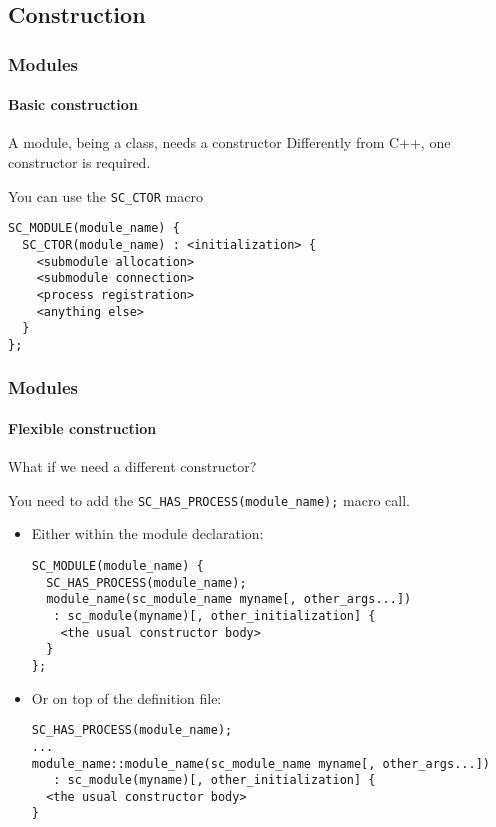 \subsection{Construction}

\begin{frame}[fragile]
\frametitle{Modules}
\framesubtitle{Basic construction}

\begin{block}{A module, being a class, needs a constructor}
Differently from C++, one constructor is required.
\end{block}
\pause
\begin{block}{You can use the \texttt{SC\_CTOR} macro}
\vspace{-1em}
\begin{verbatim}
SC_MODULE(module_name) {
  SC_CTOR(module_name) : <initialization> {
    <submodule allocation>
    <submodule connection>
    <process registration>
    <anything else>
  }
};
\end{verbatim}
\vspace{-1em}
\end{block}

\end{frame}

\begin{frame}[fragile]
\frametitle{Modules}
\framesubtitle{Flexible construction}

\begin{block}{What if we need a different constructor?}
\vspace{0.5em}
{\scriptsize
You need to add the \texttt{SC\_HAS\_PROCESS(module\_name);} macro call.

\begin{itemize}
\item Either within the module declaration:
\begin{verbatim}
SC_MODULE(module_name) {
  SC_HAS_PROCESS(module_name);
  module_name(sc_module_name myname[, other_args...]) 
   : sc_module(myname)[, other_initialization] {
    <the usual constructor body>
  }
};
\end{verbatim}
\pause
\item Or on top of the definition file:
\begin{verbatim}
SC_HAS_PROCESS(module_name);
...
module_name::module_name(sc_module_name myname[, other_args...]) 
   : sc_module(myname)[, other_initialization] {
  <the usual constructor body>
}
\end{verbatim}
\end{itemize}
}
\end{block}

\end{frame}

